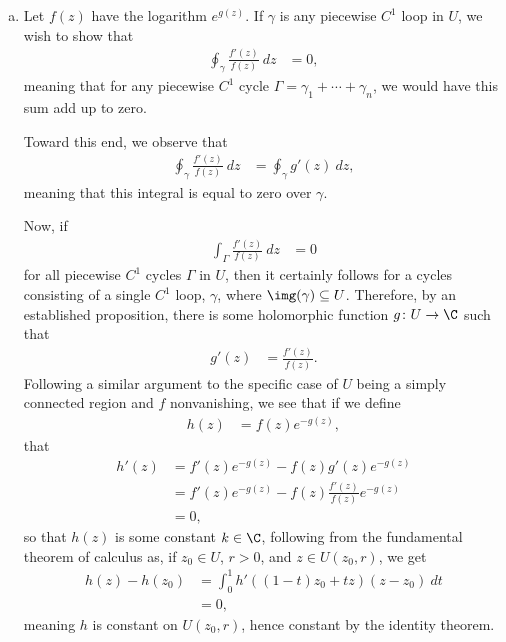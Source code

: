 \documentclass[10pt]{mypackage}
\begin{document}
\begin{solution}\hfill
  \begin{enumerate}[(a)]
    \item Let $f(z)$ have the logarithm $e^{g(z)}$. If $\gamma$ is any piecewise $C^{1}$ loop in $U$, we wish to show that
      \begin{align*}
        \oint_{\gamma}^{} \frac{f'(z)}{f(z)}\:dz &= 0,
      \end{align*}
      meaning that for any piecewise $C^{1}$ cycle $\Gamma = \gamma_1 + \cdots + \gamma_n$, we would have this sum add up to zero.\newline

      Toward this end, we observe that
      \begin{align*}
        \oint_{\gamma}^{} \frac{f'(z)}{f(z)}\:dz &= \oint_{\gamma}^{} g'(z)\:dz,
      \end{align*}
      meaning that this integral is equal to zero over $\gamma$.\newline

      Now, if
      \begin{align*}
        \int_{\Gamma}^{} \frac{f'(z)}{f(z)}\:dz &= 0
      \end{align*}
      for all piecewise $C^{1}$ cycles $\Gamma$ in $U$, then it certainly follows for a cycles consisting of a single $C^{1}$ loop, $\gamma$, where $\img(\gamma)\subseteq U$. Therefore, by an established proposition, there is some holomorphic function $g\colon U\rightarrow \C$ such that
      \begin{align*}
        g'(z) &= \frac{f'(z)}{f(z)}.
      \end{align*}
      Following a similar argument to the specific case of $U$ being a simply connected region and $f$ nonvanishing, we see that if we define
      \begin{align*}
        h(z) &= f(z)e^{-g(z)},
      \end{align*}
      that
      \begin{align*}
        h'(z) &= f'(z)e^{-g(z)} - f(z)g'(z)e^{-g(z)}\\
              &= f'(z)e^{-g(z)} - f(z)\frac{f'(z)}{f(z)}e^{-g(z)}\\
              &= 0,
      \end{align*}
      so that $h(z)$ is some constant $k\in \C$, following from the fundamental theorem of calculus as, if $z_0\in U$, $r> 0$, and $z\in U\left( z_0,r \right)$, we get
      \begin{align*}
        h(z) - h\left(z_0\right) &= \int_{0}^{1} h'\left( \left( 1-t \right)z_0 + tz \right)\left( z-z_0 \right)\:dt\\
                                 &= 0,
      \end{align*}
      meaning $h$ is constant on $U\left( z_0,r \right)$, hence constant by the identity theorem.\newline


\end{enumerate}
\end{solution}
\end{document}
